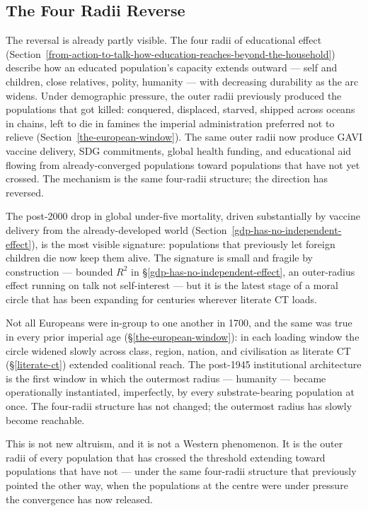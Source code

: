 \documentclass[12pt,letterpaper]{article}
\begin{document}
\subsection{The Four Radii Reverse}\label{the-four-radii-reverse}

The reversal is already partly visible. The four radii of educational
effect
(Section~\ref{from-action-to-talk-how-education-reaches-beyond-the-household})
describe how an educated population's capacity extends outward ---
self and children, close relatives, polity, humanity --- with
decreasing durability as the arc widens. Under demographic pressure,
the outer radii previously produced the populations that got killed:
conquered, displaced, starved, shipped across oceans in chains, left
to die in famines the imperial administration preferred not to
relieve (Section~\ref{the-european-window}). The same outer radii now
produce GAVI vaccine delivery, SDG commitments, global health funding,
and educational aid flowing from already-converged populations toward
populations that have not yet crossed. The mechanism is the same
four-radii structure; the direction has reversed.

The post-2000 drop
in global under-five mortality, driven substantially by vaccine
delivery from the already-developed world
(Section~\ref{gdp-has-no-independent-effect}), is the most visible
signature: populations that previously let foreign children die now
keep them alive. The signature is small and fragile by construction
--- bounded $R^2$ in §\ref{gdp-has-no-independent-effect}, an
outer-radius effect running on talk not self-interest --- but it is
the latest stage of a moral circle that has been expanding for
centuries wherever literate CT loads.

Not all Europeans were in-group
to one another in 1700, and the same was true in every prior imperial
age (§\ref{the-european-window}): in each loading window the circle
widened slowly across class, region, nation, and civilisation as
literate CT (§\ref{literate-ct}) extended coalitional reach. The
post-1945 institutional architecture is the first window in which
the outermost radius --- humanity --- became operationally
instantiated, imperfectly, by every substrate-bearing population at
once. The four-radii structure has not changed; the outermost radius
has slowly become reachable.

This is not new altruism, and it is not
a Western phenomenon. It is the outer radii of every population that
has crossed the threshold extending toward populations that have
not --- under the same four-radii structure that previously pointed
the other way, when the populations at the centre were under pressure
the convergence has now released.
\end{document}
